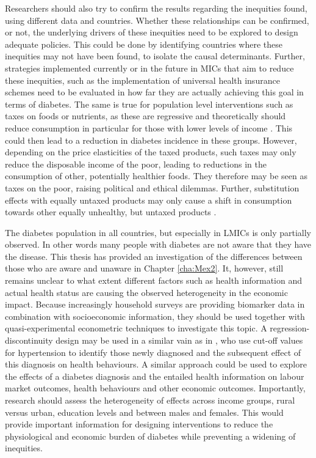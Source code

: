 Researchers should also try to confirm the results regarding the inequities found, using different data and countries. Whether these relationships can be confirmed, or not, the underlying drivers of these inequities need to be explored to design adequate policies. This could be done by identifying countries where these inequities may not have been found, to isolate the causal determinants. Further, strategies implemented currently or in the future in \acp{MIC} that aim to reduce these inequities, such as the implementation of universal health insurance schemes need to be evaluated in how far they are actually achieving this goal in terms of diabetes. The same is true for population level interventions such as taxes on foods or nutrients, as these are regressive and theoretically should reduce consumption in particular for those with lower levels of income \parencite{Mytton2012c}. This could then lead to a reduction in diabetes incidence in these groups. However, depending on the price elasticities of the taxed products, such taxes may only reduce the disposable income of the poor, leading to reductions in the consumption of other, potentially healthier foods. They therefore may be seen as taxes on the poor, raising political and ethical dilemmas. Further, substitution effects with equally untaxed products may only cause a shift in consumption towards other equally unhealthy, but untaxed products \parencite{Mytton2012c}.

The diabetes population in all countries, but especially in \acp{LMIC} is only partially observed. In other words many people with diabetes are not aware that they have the disease. This thesis has provided an investigation of the differences between those who are aware and unaware in Chapter \ref{cha:Mex2}. It, however, still remains unclear to what extent different factors such as health information and actual health status are causing the observed heterogeneity in the economic impact. Because increasingly household surveys are providing biomarker data in combination with socioeconomic information, they should be used together with quasi-experimental econometric techniques to investigate this topic. A regression-discontinuity design may be used in a similar vain as in \textcite{Zhao2013a}, who use cut-off values for hypertension to identify those newly diagnosed and the subsequent effect of this diagnosis on health behaviours. A similar approach could be used to explore the effects of a diabetes diagnosis and the entailed health information on labour market outcomes, health behaviours and other economic outcomes. Importantly, research should assess the heterogeneity of effects across income groups, rural versus urban, education levels and between males and females. This would provide important information for designing interventions to reduce the physiological and economic burden of diabetes while preventing a widening of inequities.

